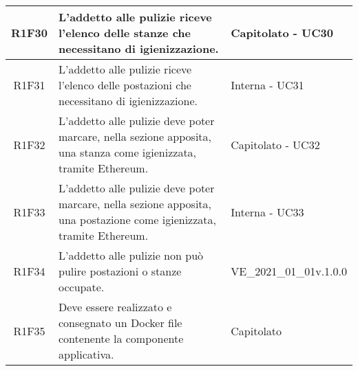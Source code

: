 \begin{center}
\begin{longtable}{|c|p{10cm}|p{4cm}|}
		R1F30&	L'addetto alle pulizie riceve l'elenco delle stanze che necessitano di igienizzazione.& 	Capitolato - UC30\\
		\hline
		R1F31&L'addetto alle pulizie riceve l'elenco delle postazioni che necessitano di igienizzazione.	& Interna - UC31	\\
		\hline
		R1F32&L'addetto alle pulizie deve poter marcare, nella sezione apposita, una stanza come igienizzata, tramite Ethereum.	& Capitolato - UC32	\\
		\hline
		R1F33&L'addetto alle pulizie deve poter marcare, nella sezione apposita, una postazione come igienizzata, tramite Ethereum.	&Interna - UC33 	\\
		\hline
		R1F34&L'addetto alle pulizie non può pulire postazioni o stanze occupate.	& VE\_2021\_01\_01v.1.0.0	\\
		\hline
		R1F35 &Deve essere realizzato e consegnato un Docker file contenente la componente applicativa. & Capitolato\\
		\hline
						
	\end{longtable}
\end{center}


